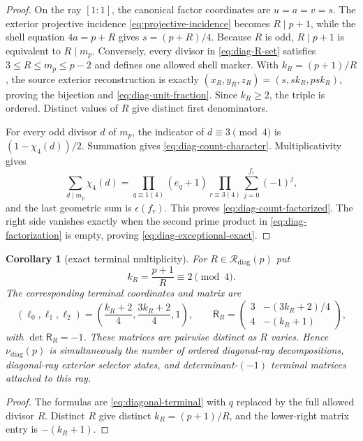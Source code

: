 \documentclass[11pt]{article}
\newtheorem{corollary}[theorem]{Corollary}
\theoremstyle{definition}
\theoremstyle{remark}
\newcommand{\1}{\mathbf 1}
\begin{document}
\begin{proof}
On the ray $[1:1]$, the canonical factor coordinates are
$u=a=v=s$.  The exterior projective incidence
\eqref{eq:projective-incidence} becomes $R\mid p+1$, while the shell equation
$4a=p+R$ gives $s=(p+R)/4$.  Because $R$ is odd, $R\mid p+1$ is equivalent to
$R\mid m_p$.  Conversely, every divisor in \eqref{eq:diag-R-set} satisfies
$3\le R\le m_p\le p-2$ and defines one allowed shell marker.  With
$k_R=(p+1)/R$, the source exterior reconstruction is exactly
$(x_R,y_R,z_R)=(s,sk_R,psk_R)$, proving the bijection and
\eqref{eq:diag-unit-fraction}.  Since $k_R\ge2$, the triple is ordered.
Distinct values of $R$ give distinct first denominators.

For every odd divisor $d$ of $m_p$, the indicator of $d\equiv3\pmod4$ is
$(1-\chi_4(d))/2$.  Summation gives
\eqref{eq:diag-count-character}.  Multiplicativity gives
\[
 \sum_{d\mid m_p}\chi_4(d)
 =\prod_{q\equiv1(4)}(e_q+1)
  \prod_{r\equiv3(4)}\sum_{j=0}^{f_r}(-1)^j,
\]
and the last geometric sum is $\epsilon(f_r)$.  This proves
\eqref{eq:diag-count-factorized}.  The right side vanishes exactly when the
second prime product in \eqref{eq:diag-factorization} is empty, proving
\eqref{eq:diag-exceptional-exact}.
\end{proof}

\begin{corollary}[exact terminal multiplicity]
For $R\in\mathscr R_{\mathrm{diag}}(p)$ put
\begin{equation}\label{eq:diag-k}
 k_R=\frac{p+1}{R}\equiv2\pmod4.
\end{equation}
The corresponding terminal coordinates and matrix are
\begin{equation}\label{eq:diag-terminal-all}
 (\ell_0,\ell_1,\ell_2)
 =\left(\frac{k_R+2}{4},\frac{3k_R+2}{4},1\right),
 \qquad
 \mathsf R_R=
 \begin{pmatrix}
 3&-(3k_R+2)/4\\
 4&-(k_R+1)
 \end{pmatrix},
\end{equation}
with $\det\mathsf R_R=-1$.  These matrices are pairwise distinct as $R$
varies.  Hence $\nu_{\mathrm{diag}}(p)$ is simultaneously the number of
ordered diagonal-ray decompositions, diagonal-ray exterior selector states,
and determinant-$(-1)$ terminal matrices attached to this ray.
\end{corollary}

\begin{proof}
The formulas are \eqref{eq:diagonal-terminal} with $q$ replaced by the full
allowed divisor $R$.  Distinct $R$ give distinct $k_R=(p+1)/R$, and the
lower-right matrix entry is $-(k_R+1)$.
\end{proof}
\end{document}
